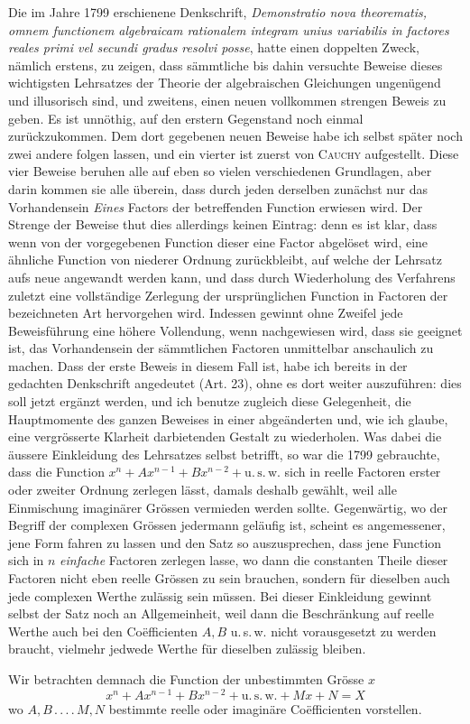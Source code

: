 Die im Jahre 1799 erschienene Denkschrift, \emph{Demonstratio nova
theorematis, omnem functionem algebraicam rationalem integram unius
variabilis in factores reales primi vel secundi gradus resolvi posse},
hatte einen doppelten Zweck, nämlich erstens, zu zeigen, dass
sämmtliche bis dahin versuchte Beweise dieses wichtigsten Lehrsatzes
der Theorie der algebraischen Gleichungen ungenügend und illusorisch
sind, und zweitens, einen neuen vollkommen strengen Beweis zu geben.
Es ist unnöthig, auf den erstern Gegenstand noch einmal zurückzukommen.
Dem dort gegebenen neuen Beweise habe ich selbst später noch zwei
andere folgen lassen, und ein vierter ist zuerst von
\textsc{Cauchy} aufgestellt. Diese vier Beweise beruhen alle auf eben so vielen verschiedenen Grundlagen,
aber darin kommen sie alle überein, dass durch jeden derselben
zunächst nur das Vorhandensein \emph{Eines} Factors der betreffenden
Function erwiesen wird. Der Strenge der Beweise thut dies allerdings
keinen Eintrag: denn es ist klar, dass wenn von der vorgegebenen
Function dieser eine Factor abgelöset wird, eine ähnliche Function
von niederer Ordnung zurückbleibt, auf welche der Lehrsatz aufs
neue angewandt werden kann, und dass durch Wiederholung des
Verfahrens zuletzt eine vollständige Zerlegung der ursprünglichen
Function in Factoren der bezeichneten Art hervorgehen wird.
Indessen gewinnt ohne Zweifel jede Beweisführung eine höhere
Vollendung, wenn nachgewiesen wird, dass sie geeignet ist, das
Vorhandensein der sämmtlichen Factoren unmittelbar anschaulich
zu machen. Dass der erste Beweis in diesem Fall ist, habe ich
bereits in der gedachten Denkschrift angedeutet (Art. 23), ohne
es dort weiter auszuführen: dies soll jetzt ergänzt werden, und
ich benutze zugleich diese Gelegenheit, die Hauptmomente des ganzen
Beweises in einer abgeänderten und, wie ich glaube, eine
vergrösserte Klarheit darbietenden Gestalt zu wiederholen.
Was dabei die äussere Einkleidung des Lehrsatzes selbst betrifft,
so war die 1799 gebrauchte, dass die Function
$x^n+Ax^{n-1}+Bx^{n-2}+\mathrm{u.\,s.\,w.}$ sich in reelle
Factoren erster oder zweiter Ordnung zerlegen lässt, damals
deshalb gewählt, weil alle Einmischung imaginärer Grössen vermieden
werden sollte. Gegenwärtig, wo der Begriff der complexen Grössen
jedermann geläufig ist, scheint es angemessener, jene Form fahren
zu lassen und den Satz so auszusprechen, dass jene Function sich
in $n$ \emph{einfache} Factoren zerlegen lasse, wo dann die
constanten Theile dieser Factoren nicht eben reelle Grössen zu sein
brauchen, sondern für dieselben auch jede complexen Werthe
zulässig sein müssen. Bei dieser Einkleidung gewinnt selbst der
Satz noch an Allgemeinheit, weil dann die Beschränkung auf reelle
Werthe auch bei den Coëfficienten $A,B$ u.\,s.\,w. nicht
vorausgesetzt zu werden braucht, vielmehr jedwede Werthe für
dieselben zulässig bleiben.

Wir betrachten demnach die Function der unbestimmten Grösse $x$
\[
x^n+Ax^{n-1}+Bx^{n-2}+\mathrm{u.\,s.\,w.}+Mx+N=X
\]
wo $A,B\,.\,.\,.\,.\,M,N$ bestimmte reelle oder imaginäre Coëfficienten
vorstellen.
